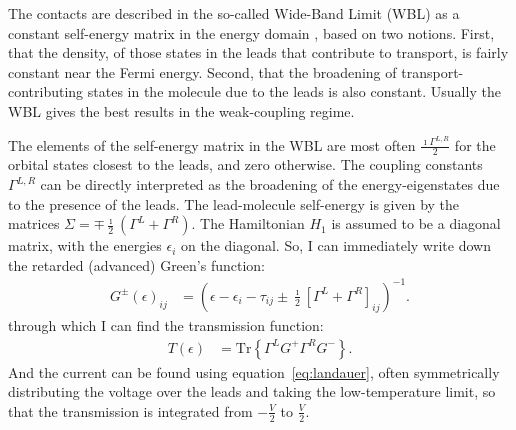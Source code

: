 The contacts are described in the so-called Wide-Band Limit (WBL) as a constant self-energy matrix in the energy domain \cite{wbl}, based on two notions. First, that the density, of those states in the leads that contribute to transport, is fairly constant near the Fermi energy. Second, that the broadening of transport-contributing states in the molecule due to the leads is also constant. Usually the WBL gives the best results in the weak-coupling regime.

The elements of the self-energy matrix in the WBL are most often $\frac{\imath \Gamma^{L,R}}{2}$ for the orbital states closest to the leads, and zero otherwise. The coupling constants $\Gamma^{L,R}$ can be directly interpreted as the broadening of the energy-eigenstates due to the presence of the leads. The lead-molecule self-energy is given by the matrices $\Sigma = \mp \frac{\imath}{2} \left( \Gamma^L + \Gamma^R \right)$. The Hamiltonian $H_1$ is assumed to be a diagonal matrix, with the energies $\epsilon_i$ on the diagonal. So, I can immediately write down the retarded (advanced) Green's function:
\begin{align}
G^\pm(\epsilon)_{ij} &= \left(\epsilon - \epsilon_i - \tau_{ij} \pm \frac{\imath}{2} \left[\Gamma^L + \Gamma^R\right]_{ij}\right)^{-1}.
\label{eq:commongf}
\end{align}
through which I can find the transmission function:
\begin{align}
T(\epsilon) &= \text{Tr}\left\{\Gamma^L G^+ \Gamma^R G^-\right\}.
\label{eq:commonte}
\end{align}
And the current can be found using equation~\ref{eq:landauer}, often symmetrically distributing the voltage over the leads and taking the low-temperature limit, so that the transmission is integrated from $-\frac{V}{2}$ to $\frac{V}{2}$. 

\clearpage
{}